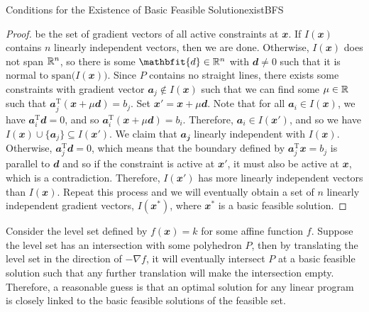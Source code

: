 \documentclass[math, code]{amznotes}
\theoremstyle{remark}
\begin{document}
\begin{thmbox}{Conditions for the Existence of Basic Feasible Solution}{existBFS}
\begin{proof}
        be the set of gradient vectors of all active constraints at $\mathbfit{x}$. If $I(\mathbfit{x})$ contains $n$ linearly independent vectors, then we are done. Otherwise, $I(\mathbfit{x})$ does not span $\mathbb{R}^n$, so there is some $\mathbfit{d} \in \R^n$ with $\mathbfit{d} \neq 0$ such that it is normal to $\mathrm{span}\bigl(I(\mathbfit{x})\bigr)$. Since $P$ contains no straight lines, there exists some constraints with gradient vector $\mathbfit{a}_j \notin I(\mathbfit{x})$ such that we can find some $\mu \in \mathbb{R}$ such that $\mathbfit{a}_j^{\mathrm{T}}(\mathbfit{x} + \mu\mathbfit{d}) = b_j$. Set $\mathbfit{x}' = \mathbfit{x} + \mu\mathbfit{d}$. Note that for all $\mathbfit{a}_i \in I(\mathbfit{x})$, we have $\mathbfit{a}_i^{\mathrm{T}}\mathbfit{d} = 0$, and so $\mathbfit{a}_i^{\mathrm{T}}(\mathbfit{x} + \mu\mathbfit{d}) = b_i$. Therefore, $\mathbfit{a}_i \in I(\mathbfit{x}')$, and so we have $I(\mathbfit{x}) \cup \{\mathbfit{a}_j\} \subseteq I(\mathbfit{x}')$. We claim that $\mathbfit{a_j}$ linearly independent with $I(\mathbfit{x})$. Otherwise, $\mathbfit{a}_j^{\mathrm{T}}\mathbfit{d} = 0$, which means that the boundary defined by $\mathbfit{a}_j^{\mathrm{T}}\mathbfit{x} = b_j$ is parallel to $\mathbfit{d}$ and so if the constraint is active at $\mathbfit{x}'$, it must also be active at $\mathbfit{x}$, which is a contradiction. Therefore, $I(\mathbfit{x}')$ has more linearly independent vectors than $I(\mathbfit{x})$. Repeat this process and we will eventually obtain a set of $n$ linearly independent gradient vectors, $I(\mathbfit{x}^*)$, where $\mathbfit{x}^*$ is a basic feasible solution.
    \end{proof}
\end{thmbox}
Consider the level set defined by $f(\mathbfit{x}) = k$ for some affine function $f$. Suppose the level set has an intersection with some polyhedron $P$, then by translating the level set in the direction of $-\nabla f$, it will eventually intersect $P$ at a basic feasible solution such that any further translation will make the intersection empty. Therefore, a reasonable guess is that an optimal solution for any linear program is closely linked to the basic feasible solutions of the feasible set.
\end{document}

